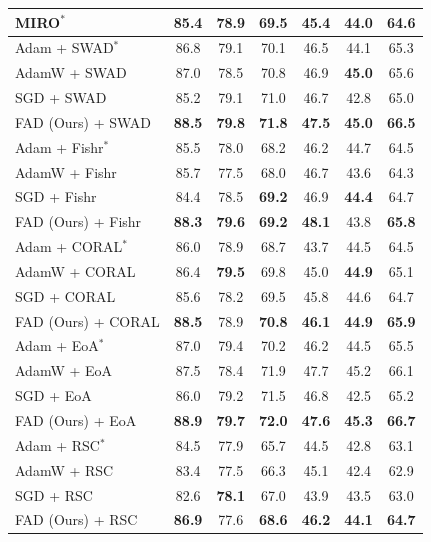 \begin{table}[th]
{\begin{tabular}{lccccc|c}
MIRO$^*$ \cite{cha2022domain} & 85.4 & 78.9 & 69.5 & 45.4 & 44.0 & 64.6 \\
\midrule
Adam + SWAD$^*$ \cite{cha2021swad} & 86.8 & 79.1 & 70.1 & 46.5 & 44.1 & 65.3 \\
AdamW + SWAD  & 87.0 & 78.5 & 70.8 & 46.9 & \textbf{45.0} & 65.6\\
SGD + SWAD & 85.2 & 79.1 & 71.0 & 46.7 & 42.8 & 65.0 \\
FAD (Ours) + SWAD & \textbf{88.5} & \textbf{79.8} & \textbf{71.8} & \textbf{47.5} & \textbf{45.0} & \textbf{66.5} \\
\midrule
Adam + Fishr$^*$ \cite{rame2022fishr} & 85.5 & 78.0 & 68.2 & 46.2 & 44.7 & 64.5 \\
AdamW + Fishr & 85.7 & 77.5 & 68.0 & 46.7 & 43.6 & 64.3 \\
SGD + Fishr & 84.4 & 78.5 & \textbf{69.2} & 46.9 & \textbf{44.4} & 64.7 \\
FAD (Ours) + Fishr & \textbf{88.3} & \textbf{79.6} & \textbf{69.2} & \textbf{48.1} & 43.8 & \textbf{65.8} \\
\midrule
Adam + CORAL$^{*}$ \cite{CORAL16} & 86.0 & 78.9 & 68.7 & 43.7 & 44.5 & 64.5 \\
AdamW + CORAL  & 86.4 & \textbf{79.5} & 69.8 & 45.0 & \textbf{44.9} & 65.1 \\
SGD + CORAL & 85.6 & 78.2 & 69.5 & 45.8 & 44.6  & 64.7\\
FAD (Ours) + CORAL  & \textbf{88.5} & 78.9 & \textbf{70.8} & \textbf{46.1} & \textbf{44.9} & \textbf{65.9} \\
\midrule
Adam + EoA$^*$ \cite{arpit2021ensemble} & 87.0 & 79.4 & 70.2 & 46.2 & 44.5 & 65.5 \\
AdamW + EoA  & 87.5 & 78.4 & 71.9 & 47.7 & 45.2 & 66.1\\
SGD + EoA & 86.0 & 79.2 & 71.5 & 46.8 & 42.5 & 65.2 \\
FAD (Ours) + EoA & \textbf{88.9} & \textbf{79.7} & \textbf{72.0} & \textbf{47.6} & \textbf{45.3} & \textbf{66.7} \\
\midrule
Adam + RSC$^{*}$ \cite{huang2020self} & 84.5 & 77.9 & 65.7 & 44.5 & 42.8 & 63.1 \\
AdamW + RSC  & 83.4 & 77.5 & 66.3 & 45.1 & 42.4 & 62.9 \\
SGD + RSC & 82.6 & \textbf{78.1} & 67.0 & 43.9 & 43.5  & 63.0\\
FAD (Ours) + RSC  & \textbf{86.9} & 77.6 & \textbf{68.6} & \textbf{46.2} & \textbf{44.1} & \textbf{64.7} \\

\bottomrule
\end{tabular}}
\label{tab:dg-all}
\label{tab:ensemble}
\end{table}







